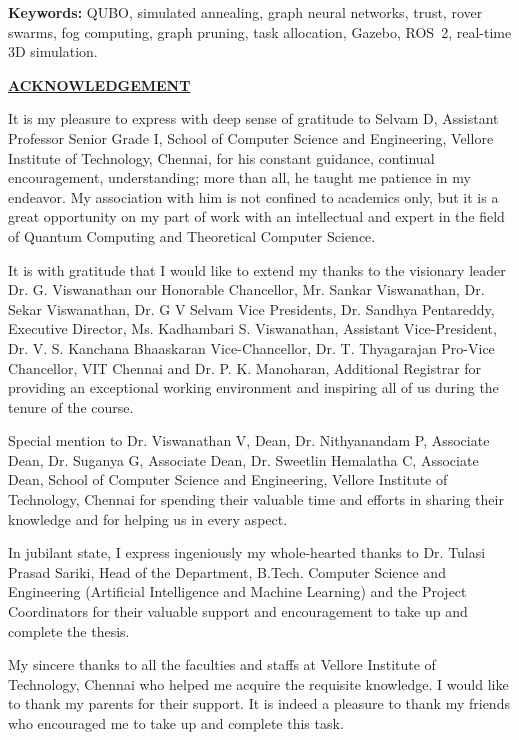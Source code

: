\documentclass[12pt,a4paper,oneside]{report}
\theoremstyle{definition}
\theoremstyle{plain}
\theoremstyle{remark}
\newcommand{\guidename}{Selvam D}
\newcommand{\guidedesignation}{Assistant Professor Senior Grade I}
\newcommand{\guidearea}{Quantum Computing and Theoretical Computer Science}
\providecommand{\programme}{Artificial Intelligence and Machine Learning}
\providecommand{\hodname}{Dr. Tulasi Prasad Sariki}
\newcommand{\frontheading}[1]{%
  \begin{center}{\fontsize{14}{17}\selectfont\bfseries\underline{#1}}\end{center}\vspace{10pt}}
\begin{document}
\vspace{8pt}
\noindent\textbf{Keywords:} QUBO, simulated annealing, graph neural networks,
trust, rover swarms, fog computing, graph pruning, task allocation, Gazebo,
ROS~2, real-time 3D simulation.
\clearpage

{}
\frontheading{ACKNOWLEDGEMENT}

It is my pleasure to express with deep sense of gratitude to \guidename,
\guidedesignation, School of Computer Science and Engineering, Vellore
Institute of Technology, Chennai, for his constant guidance, continual
encouragement, understanding; more than all, he taught me patience in my
endeavor. My association with him is not confined to academics only, but it
is a great opportunity on my part of work with an intellectual and expert in
the field of \guidearea.

It is with gratitude that I would like to extend my thanks to the visionary
leader Dr. G. Viswanathan our Honorable Chancellor, Mr. Sankar Viswanathan,
Dr. Sekar Viswanathan, Dr. G V Selvam Vice Presidents, Dr. Sandhya
Pentareddy, Executive Director, Ms. Kadhambari S. Viswanathan, Assistant
Vice-President, Dr. V. S. Kanchana Bhaaskaran Vice-Chancellor, Dr. T.
Thyagarajan Pro-Vice Chancellor, VIT Chennai and Dr. P. K. Manoharan,
Additional Registrar for providing an exceptional working environment and
inspiring all of us during the tenure of the course.

Special mention to Dr. Viswanathan V, Dean, Dr. Nithyanandam P, Associate
Dean, Dr. Suganya G, Associate Dean, Dr. Sweetlin Hemalatha C, Associate
Dean, School of Computer Science and Engineering, Vellore Institute of
Technology, Chennai for spending their valuable time and efforts in sharing
their knowledge and for helping us in every aspect.

In jubilant state, I express ingeniously my whole-hearted thanks to
\hodname, Head of the Department, B.Tech. Computer Science and
Engineering (\programme) and the Project
Coordinators for their valuable support and encouragement to take up and
complete the thesis.

My sincere thanks to all the faculties and staffs at Vellore Institute of
Technology, Chennai who helped me acquire the requisite knowledge. I would
like to thank my parents for their support. It is indeed a pleasure to thank
my friends who encouraged me to take up and complete this task.
\end{document}
